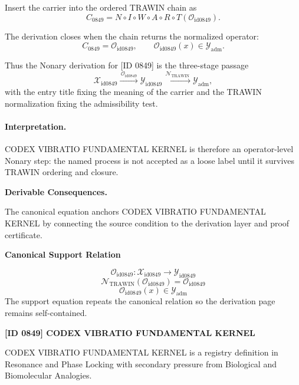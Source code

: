 Insert the carrier into the ordered TRAWIN chain as\[
C_{0849}=N\circ I\circ W\circ A\circ R\circ T(\mathcal{O}_{\mathrm{id0849}}).
\]

The derivation closes when the chain returns the normalized operator:\[
C_{0849}=\mathcal{O}_{\mathrm{id0849}},\qquad \mathcal{O}_{\mathrm{id0849}}(x)\in\mathcal{Y}_{\mathrm{adm}}.
\]

Thus the Nonary derivation for [ID 0849] is the three-stage passage
\[
\mathcal{X}_{\mathrm{id0849}}\xrightarrow{\,\mathcal{O}_{\mathrm{id0849}}\,} \mathcal{Y}_{\mathrm{id0849}}\xrightarrow{\,\mathcal{N}_{\mathrm{TRAWIN}}\,} \mathcal{Y}_{\mathrm{adm}},
\]
with the entry title fixing the meaning of the carrier and the TRAWIN normalization fixing the admissibility test.

\paragraph{Interpretation.} CODEX VIBRATIO FUNDAMENTAL KERNEL is therefore an operator-level Nonary step: the named process is not accepted as a loose label until it survives TRAWIN ordering and closure.

\par\vspace{0.35em}
\noindent\textbf{Derivable Consequences.}\quad
\begingroup
\footnotesize
\raggedright
The canonical equation anchors CODEX VIBRATIO FUNDAMENTAL KERNEL by connecting the source condition to the derivation layer and proof certificate.
\par\endgroup

\noindent\textbf{Canonical Support Relation}\par
\[
\mathcal{O}_{\mathrm{id0849}}:\mathcal{X}_{\mathrm{id0849}}\longrightarrow\mathcal{Y}_{\mathrm{id0849}}
\]
\[
\mathcal{N}_{\mathrm{TRAWIN}}(\mathcal{O}_{\mathrm{id0849}})=\mathcal{O}_{\mathrm{id0849}}
\]
\[
\mathcal{O}_{\mathrm{id0849}}(x)\in\mathcal{Y}_{\mathrm{adm}}
\]
\noindent The support equation repeats the canonical relation so the derivation page remains self-contained.\par

\clearpage
\noindent\textbf{[ID 0849] CODEX VIBRATIO FUNDAMENTAL KERNEL}\par
\vspace{0.35em}
\begingroup\small
{}
CODEX VIBRATIO FUNDAMENTAL KERNEL is a registry definition in Resonance and Phase Locking with secondary pressure from Biological and Biomolecular Analogies.

